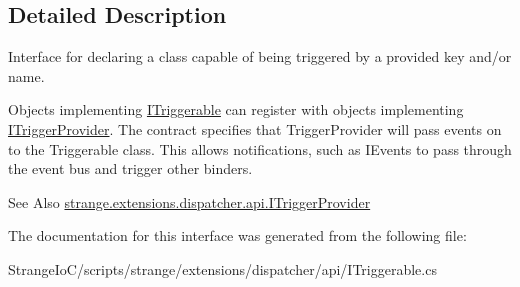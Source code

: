 \subsection{Detailed Description}
Interface for declaring a class capable of being triggered by a provided key and/or name. 

Objects implementing \hyperlink{interfacestrange_1_1extensions_1_1dispatcher_1_1api_1_1_i_triggerable}{I\-Triggerable} can register with objects implementing \hyperlink{interfacestrange_1_1extensions_1_1dispatcher_1_1api_1_1_i_trigger_provider}{I\-Trigger\-Provider}. The contract specifies that Trigger\-Provider will pass events on to the Triggerable class. This allows notifications, such as I\-Events to pass through the event bus and trigger other binders.

\begin{DoxySeeAlso}{See Also}
\hyperlink{interfacestrange_1_1extensions_1_1dispatcher_1_1api_1_1_i_trigger_provider}{strange.\-extensions.\-dispatcher.\-api.\-I\-Trigger\-Provider} 
\end{DoxySeeAlso}


The documentation for this interface was generated from the following file\-:\begin{DoxyCompactItemize}
\item 
Strange\-Io\-C/scripts/strange/extensions/dispatcher/api/I\-Triggerable.\-cs\end{DoxyCompactItemize}
